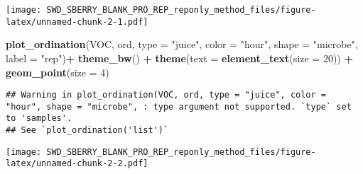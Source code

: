 \documentclass[]{article}
\newenvironment{Shaded}{\begin{snugshade}}{\end{snugshade}}
\newcommand{\KeywordTok}[1]{\textcolor[rgb]{0.13,0.29,0.53}{\textbf{#1}}}
\newcommand{\DataTypeTok}[1]{\textcolor[rgb]{0.13,0.29,0.53}{#1}}
\newcommand{\DecValTok}[1]{\textcolor[rgb]{0.00,0.00,0.81}{#1}}
\newcommand{\StringTok}[1]{\textcolor[rgb]{0.31,0.60,0.02}{#1}}
\newcommand{\CommentTok}[1]{\textcolor[rgb]{0.56,0.35,0.01}{\textit{#1}}}
\newcommand{\OperatorTok}[1]{\textcolor[rgb]{0.81,0.36,0.00}{\textbf{#1}}}
\newcommand{\NormalTok}[1]{#1}
\begin{document}
\texttt{[image: SWD\_SBERRY\_BLANK\_PRO\_REP\_reponly\_method\_files/figure-latex/unnamed-chunk-2-1.pdf]}

\begin{Shaded}
\begin{Highlighting}[]
\KeywordTok{plot_ordination}\NormalTok{(VOC, ord, }\DataTypeTok{type =} \StringTok{"juice"}\NormalTok{, }\DataTypeTok{color =} \StringTok{"hour"}\NormalTok{, }\DataTypeTok{shape =} \StringTok{"microbe"}\NormalTok{, }\DataTypeTok{label =} \StringTok{"rep"}\NormalTok{)}\OperatorTok{+}
\StringTok{  }\KeywordTok{theme_bw}\NormalTok{() }\OperatorTok{+}\StringTok{ }\KeywordTok{theme}\NormalTok{(}\DataTypeTok{text =} \KeywordTok{element_text}\NormalTok{(}\DataTypeTok{size =} \DecValTok{20}\NormalTok{)) }\OperatorTok{+}\StringTok{ }\KeywordTok{geom_point}\NormalTok{(}\DataTypeTok{size =} \DecValTok{4}\NormalTok{)}
\end{Highlighting}
\end{Shaded}

\begin{verbatim}
## Warning in plot_ordination(VOC, ord, type = "juice", color = "hour", shape = "microbe", : type argument not supported. `type` set to 'samples'.
## See `plot_ordination('list')`
\end{verbatim}

\texttt{[image: SWD\_SBERRY\_BLANK\_PRO\_REP\_reponly\_method\_files/figure-latex/unnamed-chunk-2-2.pdf]}

\begin{Shaded}
\end{Shaded}
\end{document}
